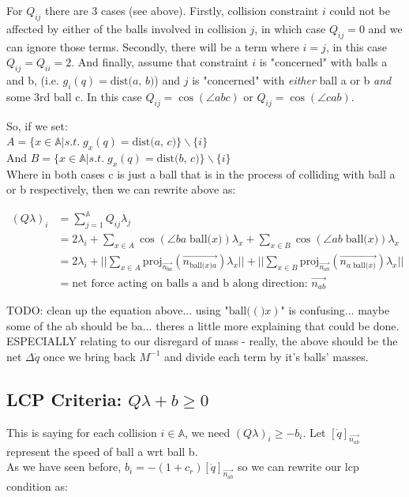 \documentclass[12pt]{article}
\newcommand{\bigA}{{\mathbb{A}}}
\newcommand{\dist}[2]{\text{dist(} #1 \text{, } #2 \text{)}}
\newcommand{\ball}[1]{\text{ball(} #1 \text{)}}
\newcommand{\proj}[2]{\text{proj}_{#1}(#2)}
\begin{document}
For $Q_{ij}$ there are 3 cases (see above). Firstly, collision constraint $i$ could
not be affected by either of the balls involved in collision $j$, in which case $Q_{ij} = 0$
and we can ignore those terms. Secondly, there will be a term where $i = j$, in this case
$Q_{ij} = Q_{ii} = 2$. And finally, assume that constraint $i$ is "concerned" with balls a and b,
(i.e. $g_i(q) = \dist{a}{b}$) and $j$ is "concerned" with \textit{either}
ball a or b \textit{and} some 3rd ball c. In this case
$Q_{ij} = \cos(\angle abc)$ or $Q_{ij} = \cos(\angle cab)$.

So, if we set:\\
$A = \{x \in \bigA | s.t. \; g_x(q) = \dist{a}{c}\} \backslash \{i\}$ \\
And $B = \{x \in \bigA | s.t. \; g_x(q) = \dist{b}{c}\} \backslash \{i\}$  \\
Where in both cases c is just a ball that is in the process of colliding with ball a or b respectively, then
we can rewrite above as:

\begin{align*}
(Q \lambda)_i 
    &= \sum_{j = 1}^{\bigA} Q_{ij} \lambda_j\\
    &= 2\lambda_i + \sum_{x \in A}^{} \cos(\angle ba\;\ball{x})\lambda_x + \sum_{x \in B}^{} \cos(\angle ab\;\ball{x})\lambda_x\\
    &= 2\lambda_i
        + ||\sum_{x \in A}^{}\proj{\overrightarrow{n_{ba}}}{\overrightarrow{n_{\ball{x}a}}} \lambda_x||
        + ||\sum_{x \in B}^{}\proj{\overrightarrow{n_{ab}}}{\overrightarrow{n_{a\;\ball{x}}}} \lambda_x||\\
    &= \text{net force acting on balls a and b along direction: } \overrightarrow{n_{ab}}
\end{align*}


TODO: clean up the equation above... using "$\ball(x)$" is confusing... maybe some of the ab should be ba...
theres a little more explaining that could be done. ESPECIALLY relating to our disregard of mass - 
really, the above should be the net $\Delta \dot{q}$ once we bring back $M^{-1}$ and divide each
term by it's balls' masses.

\subsection*{LCP Criteria: $Q\lambda + b \geq 0$}

This is saying for each collision $i \in \bigA$, we need $(Q\lambda)_i \geq -b_i$.
Let $[\dot{q}]_{\overrightarrow{n_{ab}}}$ represent the speed of ball a wrt ball b.\\
As we have seen before, $b_i = -(1 + c_r) [\dot{q}]_{\overrightarrow{n_{ab}}}$
so we can rewrite our lcp condition as:
\end{document}
